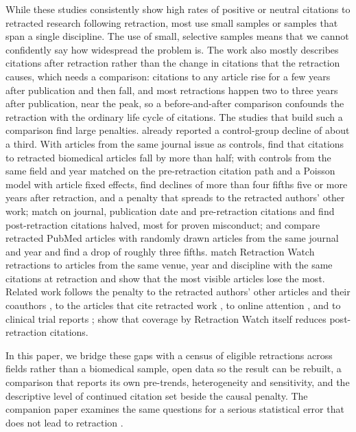 \documentclass[11pt,letterpaper]{article}
\begin{document}
While these studies consistently show high rates of positive or neutral citations to retracted research following retraction, most use small samples or samples that span a single discipline. The use of small, selective samples means that we cannot confidently say how widespread the problem is. The work also mostly describes citations after retraction rather than the change in citations that the retraction causes, which needs a comparison: citations to any article rise for a few years after publication and then fall, and most retractions happen two to three years after publication, near the peak, so a before-and-after comparison confounds the retraction with the ordinary life cycle of citations. The studies that build such a comparison find large penalties. \citet{pfeifer1990continued} already reported a control-group decline of about a third. With articles from the same journal issue as controls, \citet{furman2012} find that citations to retracted biomedical articles fall by more than half; with controls from the same field and year matched on the pre-retraction citation path and a Poisson model with article fixed effects, \citet{lu2013} find declines of more than four fifths five or more years after retraction, and a penalty that spreads to the retracted authors' other work; \citet{shuai2017multidimensional} match on journal, publication date and pre-retraction citations and find post-retraction citations halved, most for proven misconduct; and \citet{kuhberger2022selfcorrection} compare retracted PubMed articles with randomly drawn articles from the same journal and year and find a drop of roughly three fifths. \citet{memon2026widely} match Retraction Watch retractions to articles from the same venue, year and discipline with the same citations at retraction and show that the most visible articles lose the most. Related work follows the penalty to the retracted authors' other articles and their coauthors \citep{azoulay2015, azoulay2017career, jin2019reverse, mongeon2016costly, hussinger2019guilt}, to the articles that cite retracted work \citep{wang2026does, garciaromero2026enduring}, to online attention \citep{peng2022dynamics}, and to clinical trial reports \citep{mott2019assessing, song2025systematic}; \citet{xu2023too} show that coverage by Retraction Watch itself reduces post-retraction citations.

In this paper, we bridge these gaps with a census of eligible retractions across fields rather than a biomedical sample, open data so the result can be rebuilt, a comparison that reports its own pre-trends, heterogeneity and sensitivity, and the descriptive level of continued citation set beside the causal penalty. The companion paper examines the same questions for a serious statistical error that does not lead to retraction \citep{cor2026}.
\end{document}
